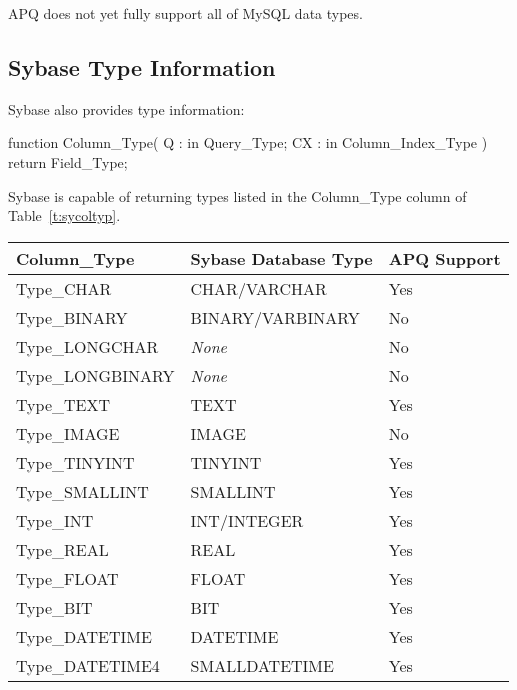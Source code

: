\documentclass[english,letterpaper]{book}
\begin{document}
APQ does not yet fully support all of MySQL data types.


\subsection*{Sybase Type Information}

Sybase also provides type information:

\begin{Code}
function Column_Type(
   Q :  in Query_Type;
   CX : in Column_Index_Type
) return Field_Type;
\end{Code}

Sybase is capable of returning types listed in the Column\_Type column
of Table~\ref{t:sycoltyp}.

\begin{table}
   \begin{center}
      \begin{tabular}{lll}
         Column\_Type               &  Sybase Database Type &  APQ Support\\
         \hline 
         Type\_CHAR                 &  CHAR/VARCHAR         &  Yes\\
         Type\_BINARY               &  BINARY/VARBINARY     &  No\\
         Type\_LONGCHAR             &  \emph{None}          &  No\\
         Type\_LONGBINARY           &  \emph{None}          &  No\\
         Type\_TEXT                 &  TEXT                 &  Yes\\
         Type\_IMAGE                &  IMAGE                &  No\\
         Type\_TINYINT              &  TINYINT              &  Yes\\
         Type\_SMALLINT             &  SMALLINT             &  Yes\\
         Type\_INT                  &  INT/INTEGER          &  Yes\\
         Type\_REAL                 &  REAL                 &  Yes\\
         Type\_FLOAT                &  FLOAT                &  Yes\\
         Type\_BIT                  &  BIT                  &  Yes\\
         Type\_DATETIME             &  DATETIME             &  Yes\\
         Type\_DATETIME4            &  SMALLDATETIME        &  Yes\\

\end{tabular}
\end{center}
\end{table}
\end{document}
